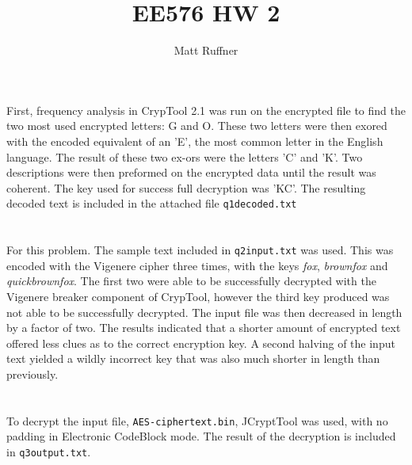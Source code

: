 \documentclass[letterpaper]{article}
\title{EE576 HW 2}
\author{Matt Ruffner}
\begin{document}
\maketitle

\section{}
First, frequency analysis in CrypTool 2.1 was run on the encrypted file to find the two most used encrypted letters: G and O. These two letters were then exored with the encoded equivalent of an 'E', the most common letter in the English language. The result of these two ex-ors were the letters 'C' and 'K'. Two descriptions were then preformed on the encrypted data until the result was coherent. The key used for success full decryption was 'KC'. The resulting decoded text is included in the attached file \texttt{q1decoded.txt}

\section{}
For this problem. The sample text included in \texttt{q2input.txt} was used. This was encoded with the Vigenere cipher three times, with the keys \textit{fox}, \textit{brownfox} and \textit{quickbrownfox}. The first two were able to be successfully decrypted with the Vigenere breaker component of CrypTool, however the third key produced was not able to be successfully decrypted. The input file was then decreased in length by a factor of two. The results indicated that a shorter amount of encrypted text offered less clues as to the correct encryption key. A second halving of the input text yielded  a wildly incorrect key that was also much shorter in length than previously.

\section{}
To decrypt the input file, \texttt{AES-ciphertext.bin}, JCryptTool was used, with no padding in Electronic CodeBlock mode. The result of the decryption is included in \texttt{q3output.txt}.

\section{}


\section{}
\end{document}
